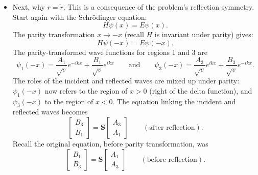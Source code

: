 \documentclass[11pt, a4paper]{article}
\newcommand{\eqtext}[1]{\qquad \text{#1} \qquad}
\newcommand{\Schro}{Schr\"{o}dinger\xspace}
\newcommand{\mat}[1]{\mathbf{#1}} %
\begin{document}
\begin{itemize}
	\item Next, why $ r = \tilde{r} $. This is a consequence of the problem's reflection symmetry. Start again with the \Schro equation:
	\begin{equation*}
		H \psi(x) = E \psi(x).
	\end{equation*}
	The parity transformation $ x \to -x $ (recall $ H $ is invariant under parity) gives:
	\begin{equation*}
		H\psi(-x) = E\psi(-x).
	\end{equation*}
	The parity-transformed wave functions for regions 1 and 3 are
	\begin{equation*}
		\psi_{1}(-x) = \frac{A_{1}}{\sqrt{v}} e^{-ikx} + \frac{B_{1}}{\sqrt{v}}e^{ikx} \eqtext{and} \psi_{3}(-x) = \frac{A_{3}}{\sqrt{v}} e^{ikx} + \frac{B_{3}}{\sqrt{v}}e^{-ikx}.
	\end{equation*}
	The roles of the incident and reflected waves are mixed up under parity: $ \psi_{1}(-x) $ now refers to the region of $ x > 0 $ (right of the delta function), and $ \psi_{3}(-x) $ to the region of $ x < 0 $. The equation linking the incident and reflected waves becomes
	\begin{equation*}
		\begin{bmatrix}
			B_{3}\\
			B_{1} 
		\end{bmatrix}
		= 
		\mat{S}
		\begin{bmatrix}
			A_{3}\\
			A_{1}
		\end{bmatrix}
		\qquad (\text{after reflection}).
	\end{equation*}
	Recall the original equation, before parity transformation, was
	\begin{equation*}
		\begin{bmatrix}
			B_{1}\\
			B_{3} 
		\end{bmatrix}
		= 
		\mat{S}
		\begin{bmatrix}
			A_{1}\\
			A_{3}
		\end{bmatrix}
		\qquad (\text{before reflection}).
	\end{equation*}
	

\end{itemize}
\end{document}
